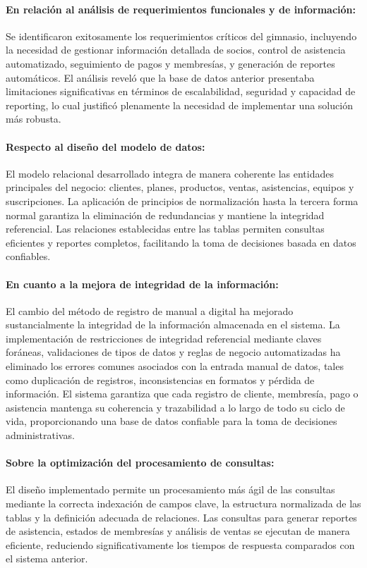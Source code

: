 \documentclass[12pt, letterpaper]{article}
\begin{document}
\paragraph{En relación al análisis de requerimientos funcionales y de información:}
Se identificaron exitosamente los requerimientos críticos del gimnasio, incluyendo la necesidad de gestionar información detallada de socios, control de asistencia automatizado, seguimiento de pagos y membresías, y generación de reportes automáticos. El análisis reveló que la base de datos anterior presentaba limitaciones significativas en términos de escalabilidad, seguridad y capacidad de reporting, lo cual justificó plenamente la necesidad de implementar una solución más robusta.
\paragraph{Respecto al diseño del modelo de datos:}
El modelo relacional desarrollado integra de manera coherente las entidades principales del negocio: clientes, planes, productos, ventas, asistencias, equipos y suscripciones. La aplicación de principios de normalización hasta la tercera forma normal garantiza la eliminación de redundancias y mantiene la integridad referencial. Las relaciones establecidas entre las tablas permiten consultas eficientes y reportes completos, facilitando la toma de decisiones basada en datos confiables.
\paragraph{En cuanto a la mejora de integridad de la información:}
El cambio del método de registro de manual a digital ha mejorado sustancialmente la integridad de la información almacenada en el sistema. La implementación de restricciones de integridad referencial mediante claves foráneas, validaciones de tipos de datos y reglas de negocio automatizadas ha eliminado los errores comunes asociados con la entrada manual de datos, tales como duplicación de registros, inconsistencias en formatos y pérdida de información. 
El sistema garantiza que cada registro de cliente, membresía, pago o asistencia mantenga su coherencia y trazabilidad a lo largo de todo su ciclo de vida, proporcionando una base de datos confiable para la toma de decisiones administrativas.
\paragraph{Sobre la optimización del procesamiento de consultas:}
El diseño implementado permite un procesamiento más ágil de las consultas mediante la correcta indexación de campos clave, la estructura normalizada de las tablas y la definición adecuada de relaciones. Las consultas para generar reportes de asistencia, estados de membresías y análisis de ventas se ejecutan de manera eficiente, reduciendo significativamente los tiempos de respuesta comparados con el sistema anterior.
\end{document}
